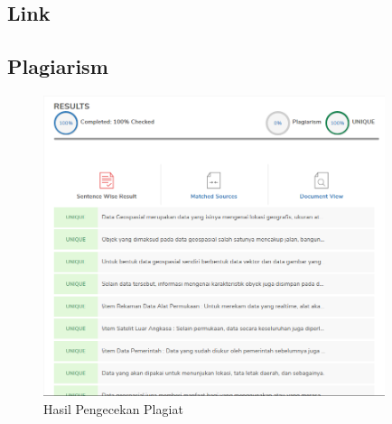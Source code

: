 \subsection{Link}
\subsection{Plagiarism}
\begin{figure}[H]
	\includegraphics[width=10cm]{figures/1174035/tugas1/plagiat.png}
	\centering
	\caption{Hasil Pengecekan Plagiat}
\end{figure}

